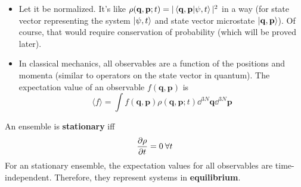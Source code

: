 \documentclass{article}
\newcommand{\ve}{\mathbf}
\begin{document}
\begin{itemize}
    \item Let it be normalized. It's like $\rho(\ve q,\ve p;t)=|\braket{\ve q,\ve p}{\psi,t}|^2$ in a way (for state vector representing the system $\ket{\psi,t}$ and state vector microstate $\ket{\ve q,\ve p}$). Of course, that would require conservation of probability (which will be proved later). 
    \item In classical mechanics, all observables are a function of the positions and momenta (similar to operators on the state vector in quantum). The expectation value of an observable $f(\ve q,\ve p)$ is
    \begin{equation}
        \langle f\rangle=\int f(\ve q,\ve p)\rho(\ve q,\ve p;t)\dd^{3N}\ve q\dd^{3N}\ve p
    \end{equation}
\end{itemize}
\begin{definition}
    An ensemble is \textbf{stationary} iff
    \begin{equation}
        \partialderivative{\rho}{t}=0\:\forall t
    \end{equation}
    For an stationary ensemble, the expectation values for all observables are time-independent. Therefore, they represent systems in \textbf{equilibrium}.
\end{definition}
\end{document}
